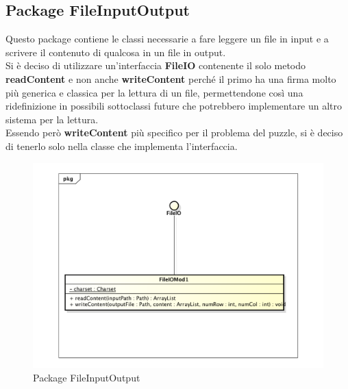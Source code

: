	\subsection{Package FileInputOutput}
Questo package contiene le classi necessarie a fare leggere un file in input e a scrivere il contenuto di qualcosa in un file in output. \\
Si è deciso di utilizzare un'interfaccia \textbf{FileIO} contenente il solo metodo \textbf{readContent} e non anche \textbf{writeContent} perché il primo ha una firma molto più generica e classica per la lettura di un file, permettendone così una ridefinizione in possibili sottoclassi future che potrebbero implementare un altro sistema per la lettura. \\
Essendo però \textbf{writeContent} più specifico per il problema del puzzle, si è deciso di tenerlo solo nella classe che implementa l'interfaccia.

		\begin{figure}[htbp]
			\centering
			\includegraphics[width=15cm]{img/FileInputOutput.pdf}
			\caption{Package FileInputOutput}
			\label{Package FileInputOutput}
		\end{figure}

	
